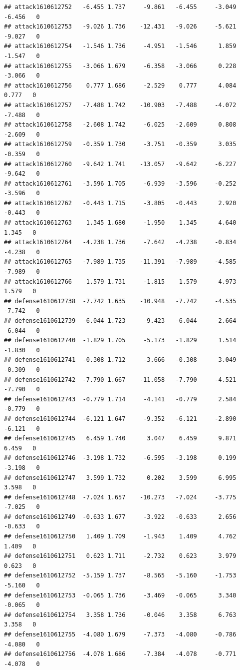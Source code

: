 \documentclass[
]{article}
\begin{document}
\begin{verbatim}
## attack1610612752   -6.455 1.737     -9.861   -6.455     -3.049  -6.456   0
## attack1610612753   -9.026 1.736    -12.431   -9.026     -5.621  -9.027   0
## attack1610612754   -1.546 1.736     -4.951   -1.546      1.859  -1.547   0
## attack1610612755   -3.066 1.679     -6.358   -3.066      0.228  -3.066   0
## attack1610612756    0.777 1.686     -2.529    0.777      4.084   0.777   0
## attack1610612757   -7.488 1.742    -10.903   -7.488     -4.072  -7.488   0
## attack1610612758   -2.608 1.742     -6.025   -2.609      0.808  -2.609   0
## attack1610612759   -0.359 1.730     -3.751   -0.359      3.035  -0.359   0
## attack1610612760   -9.642 1.741    -13.057   -9.642     -6.227  -9.642   0
## attack1610612761   -3.596 1.705     -6.939   -3.596     -0.252  -3.596   0
## attack1610612762   -0.443 1.715     -3.805   -0.443      2.920  -0.443   0
## attack1610612763    1.345 1.680     -1.950    1.345      4.640   1.345   0
## attack1610612764   -4.238 1.736     -7.642   -4.238     -0.834  -4.238   0
## attack1610612765   -7.989 1.735    -11.391   -7.989     -4.585  -7.989   0
## attack1610612766    1.579 1.731     -1.815    1.579      4.973   1.579   0
## defense1610612738  -7.742 1.635    -10.948   -7.742     -4.535  -7.742   0
## defense1610612739  -6.044 1.723     -9.423   -6.044     -2.664  -6.044   0
## defense1610612740  -1.829 1.705     -5.173   -1.829      1.514  -1.830   0
## defense1610612741  -0.308 1.712     -3.666   -0.308      3.049  -0.309   0
## defense1610612742  -7.790 1.667    -11.058   -7.790     -4.521  -7.790   0
## defense1610612743  -0.779 1.714     -4.141   -0.779      2.584  -0.779   0
## defense1610612744  -6.121 1.647     -9.352   -6.121     -2.890  -6.121   0
## defense1610612745   6.459 1.740      3.047    6.459      9.871   6.459   0
## defense1610612746  -3.198 1.732     -6.595   -3.198      0.199  -3.198   0
## defense1610612747   3.599 1.732      0.202    3.599      6.995   3.598   0
## defense1610612748  -7.024 1.657    -10.273   -7.024     -3.775  -7.025   0
## defense1610612749  -0.633 1.677     -3.922   -0.633      2.656  -0.633   0
## defense1610612750   1.409 1.709     -1.943    1.409      4.762   1.409   0
## defense1610612751   0.623 1.711     -2.732    0.623      3.979   0.623   0
## defense1610612752  -5.159 1.737     -8.565   -5.160     -1.753  -5.160   0
## defense1610612753  -0.065 1.736     -3.469   -0.065      3.340  -0.065   0
## defense1610612754   3.358 1.736     -0.046    3.358      6.763   3.358   0
## defense1610612755  -4.080 1.679     -7.373   -4.080     -0.786  -4.080   0
## defense1610612756  -4.078 1.686     -7.384   -4.078     -0.771  -4.078   0

\end{verbatim}
\end{document}
